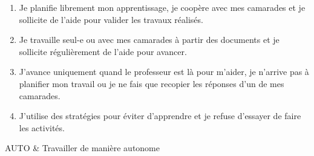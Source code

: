 

\begin{enumerate}[label = \Alph*]
  \item Je planifie librement mon apprentissage, je coopère avec mes camarades et je sollicite de l'aide pour valider les travaux réalisés.
  \item Je travaille seul-e ou avec mes camarades à partir des documents et je sollicite régulièrement de l'aide pour avancer.
  \item J'avance uniquement quand le professeur est là pour m'aider, je n'arrive pas à planifier mon travail ou je ne fais que recopier les réponses d'un de mes camarades.
  \item J'utilise des stratégies pour éviter d'apprendre et je refuse d'essayer de faire les activités.
\end{enumerate}

\begin{tableauCompetences}
  AUTO & Travailler de manière autonome  \\
\end{tableauCompetences}
